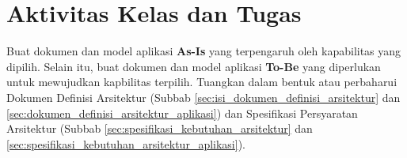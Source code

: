 \section{Aktivitas Kelas dan Tugas}
Buat dokumen dan model aplikasi \textbf{As-Is} yang terpengaruh oleh kapabilitas yang dipilih. Selain itu, buat dokumen dan model aplikasi \textbf{To-Be} yang diperlukan untuk mewujudkan kapbilitas terpilih. Tuangkan dalam bentuk atau perbaharui Dokumen Definisi Arsitektur (Subbab \ref{sec:isi_dokumen_definisi_arsitektur} dan \ref{sec:dokumen_definisi_arsitektur_aplikasi}) dan Spesifikasi Persyaratan Arsitektur (Subbab \ref{sec:spesifikasi_kebutuhan_arsitektur} dan  \ref{sec:spesifikasi_kebutuhan_arsitektur_aplikasi}).
